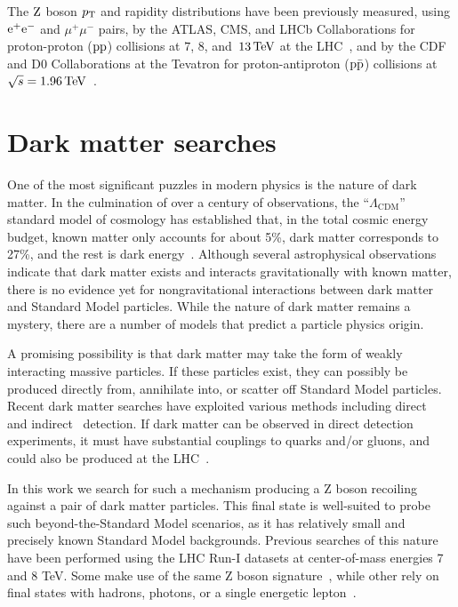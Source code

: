 The $\mathrm{Z}$ boson $p_{\mathrm{T}}$ and rapidity distributions have been previously 
measured, using $\mathrm{e}^+\mathrm{e}^-$ and $\mu^+\mu^-$ pairs, by the ATLAS, CMS, and 
LHCb Collaborations for proton-proton ($\mathrm{p}\mathrm{p}$) collisions at $7$, $8$, 
and~$13\,\text{Te\hspace{-.08em}V}$ at the LHC~\cite{ATLAS_ZpT7TeV,ATLAS_ZptEta7TeV,Aad:2015auj,Aaboud:2016btc,Sirunyan:2018owv,CMS_ZpT7TeV,CMS_ZpT8TeV,CMS:2014jea,Khachatryan:2016nbe,LHCb_WZ7TeV,LHCb_Zee7TeV,LHCb_ZpT7TeV,LHCb_WZ8TeV,Aaij:2016mgv}, 
and by the CDF and D0 Collaborations at the Tevatron for proton-antiproton ($\mathrm{p}\bar{\mathrm{p}}$)
collisions at $\sqrt{s} = 1.96\,\text{Te\hspace{-.08em}V}$~\cite{Affolder:1999jh,Abbott:1999yd,TevatronWZ:D0PhysRevLett2008_100,TevatronWZ:D0PhysLettB2010_693,TevatronWZ:D0PhysRevLett2011_106}. 

\section{Dark matter searches}

One of the most significant puzzles in modern physics is the nature of dark matter.
In the culmination of over a century of observations, the ``$\Lambda_{\mathrm{CDM}}$'' standard model of cosmology
has established that, in the total cosmic energy budget,
known matter only accounts for about 5\%, dark matter corresponds to 27\%, and the rest is dark energy~\cite{Hinshaw_2013}.
Although several astrophysical observations indicate that dark matter exists and interacts gravitationally with known matter,
there is no evidence yet for nongravitational interactions between dark matter and Standard Model particles.
While the nature of dark matter remains a mystery, there are a number of models that predict a particle physics origin. 

A promising possibility is that dark matter may take the form of weakly interacting massive particles.
If these particles exist, they can possibly be produced directly from, annihilate into, or scatter off Standard Model particles.
Recent dark matter searches have exploited various methods including direct~\cite{Cushman:2013zza} and indirect~\cite{Buckley:2013bha} detection.
If dark matter can be observed in direct detection experiments,
it must have substantial couplings to quarks and/or gluons, and could also be produced at the LHC~\cite{Beltran:2010ww,Goodman:2010yf,Bai:2010hh,Goodman:2010ku,Fox:2011pm,Rajaraman:2011wf}.

In this work we search for such a mechanism producing a Z boson recoiling against a pair of dark matter particles.
This final state is well-suited to probe such beyond-the-Standard Model scenarios, as
it has relatively small and precisely known Standard Model backgrounds.
Previous searches of this nature have been performed using the LHC Run-I datasets at center-of-mass energies 7 and 8 TeV.
Some make use of the same Z boson signature~\cite{Chatrchyan:2014tja,Khachatryan:2015bbl,Aad:2014vka},
while other rely on final states with hadrons, photons, or a single energetic lepton~\cite{Aad:2013oja,ATLAS:2014wra,Khachatryan:2014tva,Aad:2014vea,Aad:2014tda,Khachatryan:2014uma,Aad:2014wza,Aad:2015yga,Khachatryan:2015nua,Khachatryan:2014rra,Aad:2015zva,Khachatryan:2014rwa,Khachatryan:2016mdm}.

